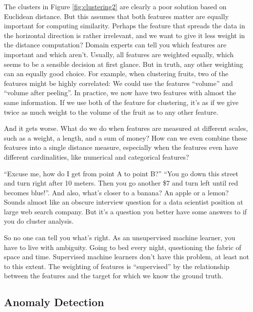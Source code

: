 \documentclass[
  10pt,
]{scrbook}
\begin{document}
The clusters in Figure \ref{fig:clustering2} are clearly a poor solution based on Euclidean distance.
But this assumes that both features matter are equally important for computing similarity.
Perhaps the feature that spreads the data in the horizontal direction is rather irrelevant, and we want to give it less weight in the distance computation?
Domain experts can tell you which features are important and which aren't.
Usually, all features are weighted equally, which seems to be a sensible decision at first glance.
But in truth, any other weighting can an equally good choice.
For example, when clustering fruits, two of the features might be highly correlated:
We could use the features ``volume'' and ``volume after peeling''.
In practice, we now have two features with almost the same information.
If we use both of the feature for clustering, it's as if we give twice as much weight to the volume of the fruit as to any other feature.

And it gets worse.
What do we do when features are measured at different scales, such as a weight, a length, and a sum of money?
How can we even combine these features into a single distance measure, especially when the features even have different cardinalities, like numerical and categorical features?

``Excuse me, how do I get from point A to point B?''
``You go down this street and turn right after 10 meters. Then you go another \$7 and turn left until red becomes blue!''.
And also, what's closer to a banana? An apple or a lemon?
Sounds almost like an obscure interview question for a data scientist position at large web search company.
But it's a question you better have some answers to if you do cluster analysis.

So no one can tell you what's right.
As an unsupervised machine learner, you have to live with ambiguity.
Going to bed every night, questioning the fabric of space and time.
Supervised machine learners don't have this problem, at least not to this extent.
The weighting of features is ``supervised'' by the relationship between the features and the target for which we know the ground truth.

\hypertarget{anomaly-detection}{%
\subsection{Anomaly Detection}\label{anomaly-detection}}
\end{document}

